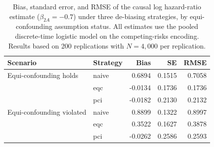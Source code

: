 \begin{table}
\centering
\begin{tabular}{llrrr}
\toprule
Scenario & Strategy & Bias & SE & RMSE \\
\midrule
Equi-confounding holds & naive & 0.6894 & 0.1515 & 0.7058 \\
 & eqc & -0.0134 & 0.1736 & 0.1736 \\
 & pci & -0.0182 & 0.2130 & 0.2132 \\
Equi-confounding violated & naive & 0.8899 & 0.1322 & 0.8997 \\
 & eqc & 0.3522 & 0.1627 & 0.3878 \\
 & pci & -0.0262 & 0.2586 & 0.2593 \\
\bottomrule
\end{tabular}
\caption{Bias, standard error, and RMSE of the causal log hazard-ratio estimate ($\beta_{2A} = -0.7$) under three de-biasing strategies, by equi-confounding assumption status. All estimates use the pooled discrete-time logistic model on the competing-risks encoding. Results based on 200 replications with $N = 4{,}000$ per replication.}
\label{tab:unified_main}
\end{table}

